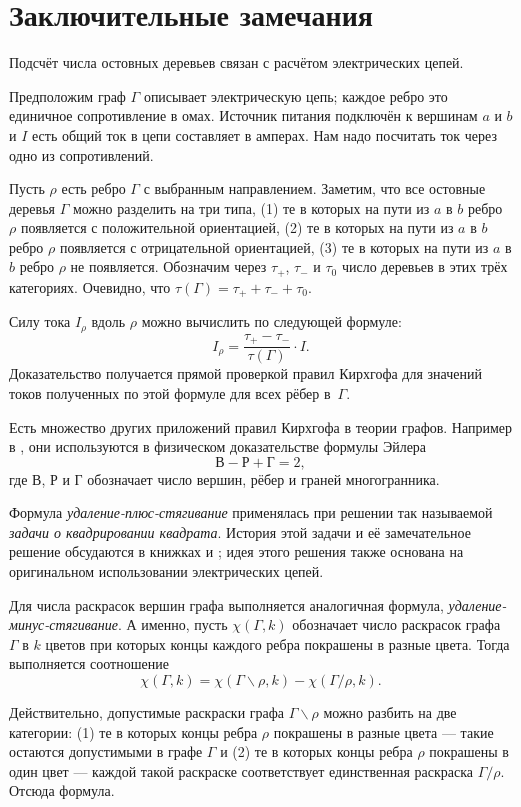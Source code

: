 \documentclass{article}
\begin{document}
\section{Заключительные замечания}

Подсчёт числа остовных деревьев связан с расчётом электрических цепей.

Предположим граф $\Gamma$ описывает электрическую цепь;
каждое ребро это единичное сопротивление в омах.
Источник питания подключён к вершинам $a$ и $b$ и $I$ есть общий ток в цепи составляет в амперах.
Нам надо посчитать ток через одно из сопротивлений.

Пусть $\rho$ есть ребро $\Gamma$ с выбранным направлением.
Заметим, что все остовные деревья $\Gamma$ можно разделить на три типа,
(1) те в которых на пути из $a$ в $b$ ребро $\rho$ появляется с положительной ориентацией,
(2) те в которых на пути из $a$ в $b$ ребро $\rho$ появляется с отрицательной ориентацией,
(3) те в которых на пути из $a$ в $b$ ребро $\rho$ не появляется.
Обозначим через $\tau_+$, $\tau_-$ и $\tau_0$ число деревьев в этих трёх категориях.
Очевидно, что $\tau(\Gamma)=\tau_++\tau_-+\tau_0$.

Силу тока $I_\rho$ вдоль $\rho$ можно вычислить по следующей формуле:
\[I_\rho=\frac{\tau_+-\tau_-}{\tau(\Gamma)}\cdot I.\]
Доказательство получается прямой проверкой правил Кирхгофа для значений токов полученных по этой формуле для всех рёбер в~$\Gamma$.

Есть множество других приложений правил Кирхгофа в теории графов. 
Например в \cite{levi}, они используются в физическом доказательстве формулы Эйлера
\[\text{В}-\text{Р}+\text{Г}=2,\]
где $\text{В}$, $\text{Р}$ и $\text{Г}$ обозначает число вершин, рёбер и граней многогранника.

Формула \emph{удаление-плюс-стягивание} применялась при решении так называемой \emph{задачи о квадрировании квадрата}.
История этой задачи и её замечательное решение обсудаются в книжках \cite{yaglom} и \cite[Глава 32]{gardner};
идея этого решения также основана на оригинальном использовании электрических цепей.

Для числа раскрасок вершин графа выполняется аналогичная формула, \emph{удаление-минус-стягивание}.
А именно, пусть $\chi(\Gamma,k)$ обозначает число раскрасок графа $\Gamma$ в $k$ цветов при которых концы каждого ребра покрашены в разные цвета.
Тогда выполняется соотношение
\[\chi(\Gamma,k)=\chi(\Gamma\backslash\rho,k)-\chi(\Gamma/\rho,k).\]

Действительно, допустимые раскраски графа $\Gamma\backslash\rho$ можно разбить на две категории: (1) те в которых концы ребра $\rho$ покрашены в разные цвета --- такие остаются допустимыми в графе $\Gamma$ и (2) те в которых концы ребра $\rho$ покрашены в один цвет --- каждой такой раскраске соответствует единственная раскраска $\Gamma/\rho$.
Отсюда формула.
\end{document}
